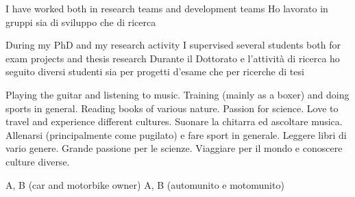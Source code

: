 {  %
  \personalSkills

    
    \communicationSkills
      {I have worked both in research teams and development teams}
      {Ho lavorato in gruppi sia di sviluppo che di ricerca}
    
    \organisationalSkills
      {During my PhD and my research activity I supervised several students both for exam projects and thesis research}
      {Durante il Dottorato e l'attività di ricerca ho seguito diversi studenti sia per progetti d'esame che per ricerche di tesi}
      
    \computerSkills
      {}
      {}
      
    \otherSkills
      {Playing the guitar and listening to music. Training (mainly as a boxer) and doing sports in general. Reading books of various nature. Passion for science. Love to travel and experience different cultures.}
      {Suonare la chitarra ed ascoltare musica. Allenarsi (principalmente come pugilato) e fare sport in generale. Leggere libri di vario genere. Grande passione per le scienze. Viaggiare per il mondo e conoscere culture diverse.}
      
    \drivingLicence
      {A, B (car and motorbike owner)}
      {A, B (automunito e motomunito)}


  \additionalInfo
  
}
